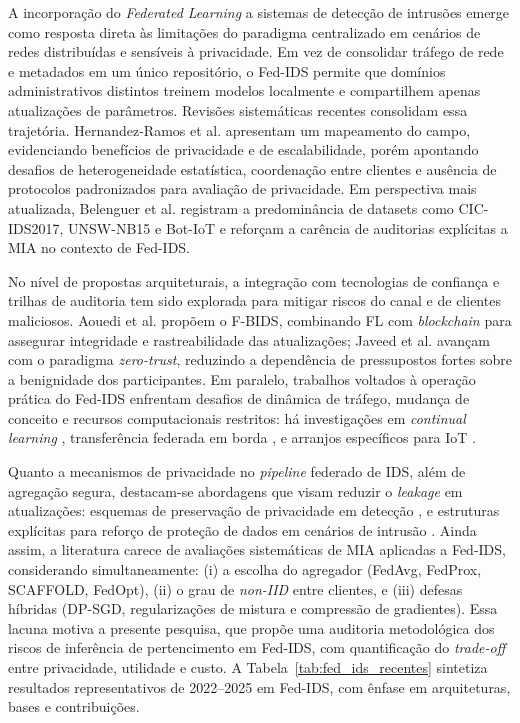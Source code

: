 \documentclass[
	12pt,				%
	openright,			%
	oneside,			%
	a4paper,			%
	english,			%
	french,				%
	spanish,			%
	brazil,				%
	]{abntex2}
\begin{document}
A incorporação do \textit{Federated Learning} a sistemas de detecção de intrusões emerge como resposta direta às limitações do paradigma centralizado em cenários de redes distribuídas e sensíveis à privacidade. Em vez de consolidar tráfego de rede e metadados em um único repositório, o Fed-IDS permite que domínios administrativos distintos treinem modelos localmente e compartilhem apenas atualizações de parâmetros. Revisões sistemáticas recentes consolidam essa trajetória. Hernandez-Ramos et al. \cite{hernandez2023surveyfedids} apresentam um mapeamento do campo, evidenciando benefícios de privacidade e de escalabilidade, porém apontando desafios de heterogeneidade estatística, coordenação entre clientes e ausência de protocolos padronizados para avaliação de privacidade. Em perspectiva mais atualizada, Belenguer et al. \cite{belenguer2025surveyfedids} registram a predominância de datasets como CIC-IDS2017, UNSW-NB15 e Bot-IoT e reforçam a carência de auditorias explícitas a MIA no contexto de Fed-IDS.

No nível de propostas arquiteturais, a integração com tecnologias de confiança e trilhas de auditoria tem sido explorada para mitigar riscos do canal e de clientes maliciosos. Aouedi et al. \cite{aouedi2023blockchainids} propõem o F-BIDS, combinando FL com \textit{blockchain} para assegurar integridade e rastreabilidade das atualizações; Javeed et al. \cite{javeed2024zerotrust} avançam com o paradigma \textit{zero-trust}, reduzindo a dependência de pressupostos fortes sobre a benignidade dos participantes. Em paralelo, trabalhos voltados à operação prática do Fed-IDS enfrentam desafios de dinâmica de tráfego, mudança de conceito e recursos computacionais restritos: há investigações em \textit{continual learning} \cite{chetouane2025continualfedids}, transferência federada em borda \cite{raja2024transferfedids}, e arranjos específicos para IoT \cite{alshammari2024springerids,mazid2025flidpp,qiu2025fedaware}.

Quanto a mecanismos de privacidade no \textit{pipeline} federado de IDS, além de agregação segura, destacam-se abordagens que visam reduzir o \textit{leakage} em atualizações: esquemas de preservação de privacidade em detecção \cite{feng2023fedphp}, e estruturas explícitas para reforço de proteção de dados em cenários de intrusão \cite{saidi2025privacyfedids}. Ainda assim, a literatura carece de avaliações sistemáticas de MIA aplicadas a Fed-IDS, considerando simultaneamente: (i) a escolha do agregador (FedAvg, FedProx, SCAFFOLD, FedOpt), (ii) o grau de \textit{non-IID} entre clientes, e (iii) defesas híbridas (DP-SGD, regularizações de mistura e compressão de gradientes). Essa lacuna motiva a presente pesquisa, que propõe uma auditoria metodológica dos riscos de inferência de pertencimento em Fed-IDS, com quantificação do \textit{trade-off} entre privacidade, utilidade e custo.
A Tabela~\ref{tab:fed_ids_recentes} sintetiza resultados representativos de 2022–2025 em Fed-IDS,
com ênfase em arquiteturas, bases e contribuições.
\end{document}

